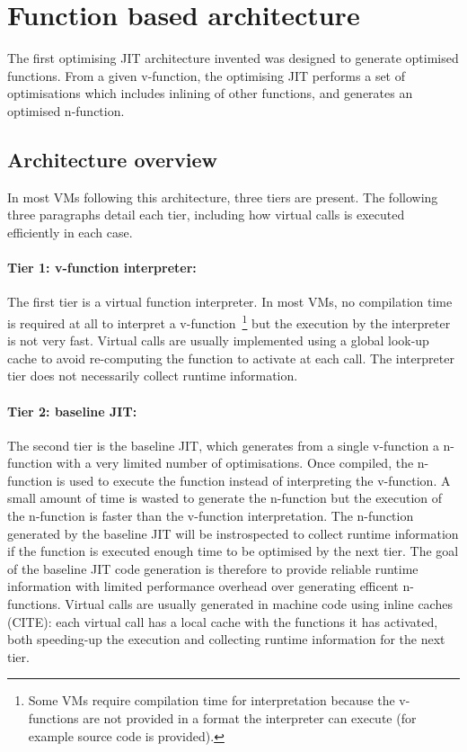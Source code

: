 \documentclass[a4paper,12pt,twoside]{../includes/ThesisStyle}
\begin{document}

\section{Function based architecture}
\label{sec:architecture}

The first optimising JIT architecture invented was designed to generate optimised functions. From a given v-function, the optimising JIT performs a set of optimisations which includes inlining of other functions, and generates an optimised n-function.

\subsection{Architecture overview}

In most VMs following this architecture, three tiers are present. The following three paragraphs detail each tier, including how virtual calls is executed efficiently in each case.

\paragraph{Tier 1: v-function interpreter: } The first tier is a virtual function interpreter. In most VMs, no compilation time is required at all to interpret a v-function~\footnote{Some VMs require compilation time for interpretation because the v-functions are not provided in a format the interpreter can execute (for example source code is provided).} but the execution by the interpreter is not very fast. Virtual calls are usually implemented using a global look-up cache to avoid re-computing the function to activate at each call. The interpreter tier does not necessarily collect runtime information. 
\paragraph{Tier 2: baseline JIT: } The second tier is the baseline JIT, which generates from a single v-function a n-function with a very limited number of optimisations. Once compiled, the n-function is used to execute the function instead of interpreting the v-function. A small amount of time is wasted to generate the n-function but the execution of the n-function is faster than the v-function interpretation. The n-function generated by the baseline JIT will be instrospected to collect runtime information if the function is executed enough time to be optimised by the next tier. The goal of the baseline JIT code generation is therefore to provide reliable runtime information with limited performance overhead over generating efficent n-functions. Virtual calls are usually generated in machine code using inline caches (CITE): each virtual call has a local cache with the functions it has activated, both speeding-up the execution and collecting runtime information for the next tier.
\end{document}
